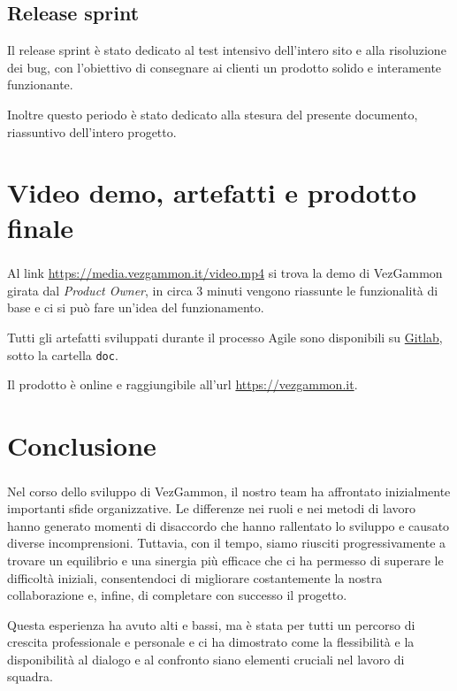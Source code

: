 \documentclass{article}
\begin{document}
\subsection{Release sprint}
Il release sprint è stato dedicato al test intensivo dell'intero sito e alla risoluzione dei bug, con l'obiettivo di consegnare ai clienti un 
prodotto solido e interamente funzionante.

Inoltre questo periodo è stato dedicato alla stesura del presente documento, riassuntivo dell'intero progetto.

\section{Video demo, artefatti e prodotto finale}
Al link \url{https://media.vezgammon.it/video.mp4} si trova la demo di VezGammon\textsuperscript{\texttrademark} girata dal \textit{Product Owner}, 
in circa 3 minuti vengono riassunte le funzionalità di base e ci si può fare un'idea del funzionamento.

Tutti gli artefatti sviluppati durante il processo Agile sono disponibili su \href{https://gitlab.vezgammon.it}{Gitlab}, sotto la cartella \texttt{doc}.

Il prodotto è online e raggiungibile all'url \url{https://vezgammon.it}.

\section{Conclusione}
Nel corso dello sviluppo di VezGammon\textsuperscript{\texttrademark}, il nostro team ha affrontato inizialmente importanti sfide organizzative. 
Le differenze nei ruoli e nei metodi di lavoro hanno generato momenti di disaccordo che hanno rallentato lo sviluppo e causato diverse incomprensioni. Tuttavia, con il tempo, 
siamo riusciti progressivamente a trovare un equilibrio e una sinergia più efficace che ci ha permesso di superare le difficoltà iniziali, consentendoci di migliorare 
costantemente la nostra collaborazione e, infine, di completare con successo il progetto. 

Questa esperienza ha avuto alti e bassi, ma è stata per tutti un percorso di crescita professionale e personale e ci ha dimostrato come la flessibilità e la disponibilità 
al dialogo e al confronto siano elementi cruciali nel lavoro di squadra.
\end{document}
